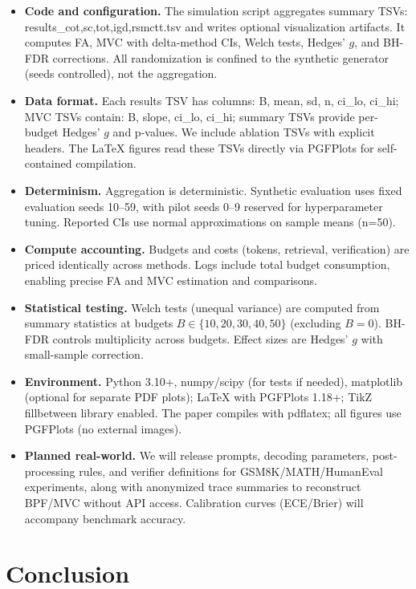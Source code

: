 \begin{itemize}[leftmargin=1.6em, itemsep=0.35em]
\item \textbf{Code and configuration.} The simulation script aggregates summary TSVs: results_{cot,sc,tot,igd,rsmctt}.tsv and writes optional visualization artifacts. It computes FA, MVC with delta-method CIs, Welch tests, Hedges’ $g$, and BH-FDR corrections. All randomization is confined to the synthetic generator (seeds controlled), not the aggregation.
\item \textbf{Data format.} Each results TSV has columns: B, mean, sd, n, ci\_lo, ci\_hi; MVC TSVs contain: B, slope, ci\_lo, ci\_hi; summary TSVs provide per-budget Hedges’ $g$ and p-values. We include ablation TSVs with explicit headers. The LaTeX figures read these TSVs directly via PGFPlots for self-contained compilation.
\item \textbf{Determinism.} Aggregation is deterministic. Synthetic evaluation uses fixed evaluation seeds 10--59, with pilot seeds 0--9 reserved for hyperparameter tuning. Reported CIs use normal approximations on sample means (n=50).
\item \textbf{Compute accounting.} Budgets and costs (tokens, retrieval, verification) are priced identically across methods. Logs include total budget consumption, enabling precise FA and MVC estimation and comparisons.
\item \textbf{Statistical testing.} Welch tests (unequal variance) are computed from summary statistics at budgets $B\in\{10,20,30,40,50\}$ (excluding $B{=}0$). BH-FDR controls multiplicity across budgets. Effect sizes are Hedges’ $g$ with small-sample correction.
\item \textbf{Environment.} Python 3.10+, numpy/scipy (for tests if needed), matplotlib (optional for separate PDF plots); LaTeX with PGFPlots 1.18+; TikZ fillbetween library enabled. The paper compiles with pdflatex; all figures use PGFPlots (no external images).
\item \textbf{Planned real-world.} We will release prompts, decoding parameters, post-processing rules, and verifier definitions for GSM8K/MATH/HumanEval experiments, along with anonymized trace summaries to reconstruct BPF/MVC without API access. Calibration curves (ECE/Brier) will accompany benchmark accuracy.
\end{itemize}

\section{Conclusion}

